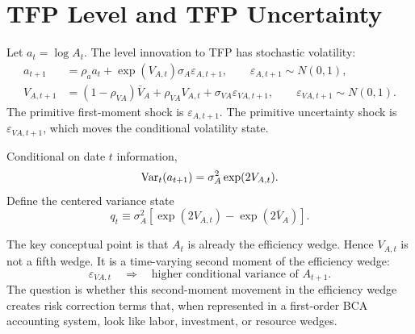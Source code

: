 \section{TFP Level and TFP Uncertainty}

Let \(a_t=\log A_t\). The level innovation to TFP has stochastic volatility:
\begin{align}
    a_{t+1}
    &=
    \rho_a a_t
    +
    \exp(V_{A,t})\sigma_A\varepsilon_{A,t+1},
    \qquad
    \varepsilon_{A,t+1}\sim N(0,1),
    \label{eq:tfp_level}
    \\
    V_{A,t+1}
    &=
    (1-\rho_{VA})\bar{V}_A
    +
    \rho_{VA} V_{A,t}
    +
    \sigma_{VA}\varepsilon_{VA,t+1},
    \qquad
    \varepsilon_{VA,t+1}\sim N(0,1).
    \label{eq:tfp_vol}
\end{align}
The primitive first-moment shock is \(\varepsilon_{A,t+1}\). The primitive
uncertainty shock is \(\varepsilon_{VA,t+1}\), which moves the conditional
volatility state.

Conditional on date \(t\) information,
\begin{equation}
    \operatorname{Var}_t(a_{t+1})=\sigma_A^2\exp(2V_{A,t}).
    \label{eq:conditional_tfp_variance}
\end{equation}
Define the centered variance state
\begin{equation}
    q_t
    \equiv
    \sigma_A^2\left[\exp(2V_{A,t})-\exp(2\bar{V}_A)\right].
    \label{eq:variance_state}
\end{equation}

The key conceptual point is that \(A_t\) is already the efficiency wedge. Hence
\(V_{A,t}\) is not a fifth wedge. It is a time-varying second moment of the
efficiency wedge:
\[
    \varepsilon_{VA,t}
    \quad \Rightarrow \quad
    \text{higher conditional variance of } A_{t+1}.
\]
The question is whether this second-moment movement in the efficiency wedge
creates risk correction terms that, when represented in a first-order BCA
accounting system, look like labor, investment, or resource wedges.
